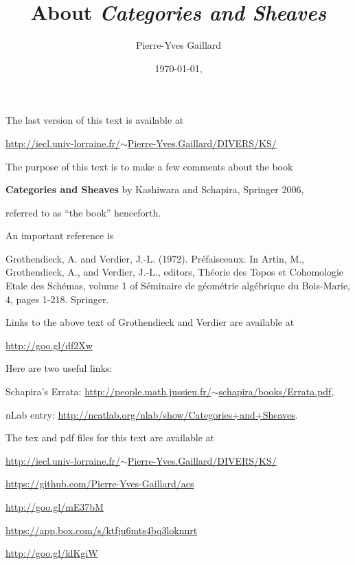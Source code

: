 \documentclass[12pt]{article}
\title{About \em{Categories and Sheaves}}
\author{Pierre-Yves Gaillard}
\date{\today, \currenttime}
\theoremstyle{remark}
\theoremstyle{definition}
\newcommand{\nn}{\noindent}
\begin{document}
\maketitle

\nn The last version of this text is available at

\nn\href{http://iecl.univ-lorraine.fr/~Pierre-Yves.Gaillard/DIVERS/KS/}{http://iecl.univ-lorraine.fr/$\sim$Pierre-Yves.Gaillard/DIVERS/KS/}

\tableofcontents\newpage

\nn The purpose of this text is to make a few comments about the book 

\textbf{Categories and Sheaves} by Kashiwara and Schapira, Springer 2006, 

\nn referred to as ``the book'' henceforth. 

An important reference is

\nn[GV] Grothendieck, A. and Verdier, J.-L. (1972). Préfaisceaux. In Artin, M., Grothendieck, A., and Verdier, J.-L., editors, Théorie des Topos et Cohomologie Etale des Schémas, volume 1 of Séminaire de géométrie algébrique du Bois-Marie, 4, pages 1-218. Springer. 

Links to the above text of Grothendieck and Verdier are available at \smallskip

\centerline{\href{http://goo.gl/df2Xw}{http://goo.gl/df2Xw}}

Here are two useful links:

\nn Schapira's Errata: \href{http://people.math.jussieu.fr/~schapira/books/Errata.pdf}{http://people.math.jussieu.fr/$\sim$schapira/books/Errata.pdf},

\nn nLab entry: \href{http://ncatlab.org/nlab/show/Categories+and+Sheaves}{http://ncatlab.org/nlab/show/Categories+and+Sheaves}. 

The tex and pdf files for this text are available at
 
\nn\href{http://iecl.univ-lorraine.fr/~Pierre-Yves.Gaillard/DIVERS/KS/}{http://iecl.univ-lorraine.fr/$\sim$Pierre-Yves.Gaillard/DIVERS/KS/}

\nn\href{https://github.com/Pierre-Yves-Gaillard/acs}{https://github.com/Pierre-Yves-Gaillard/acs}

\nn\href{http://goo.gl/mE37bM}{http://goo.gl/mE37bM}

\nn\href{https://app.box.com/s/ktfju6mts4bq3loknnrt}{https://app.box.com/s/ktfju6mts4bq3loknnrt}

\nn\href{http://goo.gl/klKgiW}{http://goo.gl/klKgiW}
\end{document}
